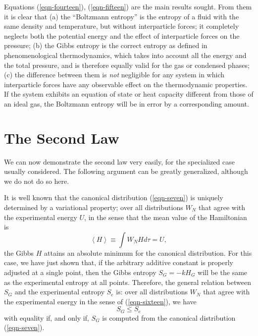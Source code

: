 \documentclass[twocolumn]{article}
\begin{document}
Equations (\ref{eqn-fourteen}), (\ref{eqn-fifteen}) are the main
results sought. From them it is clear that (a) the ``Boltzmann
entropy'' is the entropy of a fluid with the same density and
temperature, but without interparticle forces; it completely neglects
both the potential energy and the effect of interparticle forces on
the pressure; (b) the Gibbs entropy is the correct entropy as defined
in phenomenological thermodynamics, which takes into account all the
energy and the total pressure, and is therefore equally valid for the
gas or condensed phases; (c) the difference between them is \emph{not}
negligible for any system in which interparticle forces have any
observable effect on the thermodynamic properties. If the system
exhibits an equation of state or heat capacity different from those of
an ideal gas, the Boltzmann entropy will be in error by a
corresponding amount.

\section{The Second Law}\label{sec-the-second-law}

We can now demonstrate the second law very easily, for the specialized
case usually considered. The following argument can be greatly
generalized, although we do not do so here.

It is well known \citep{Jaynes-brandeis62} that the canonical distribution (\ref{eqn-seven})
is uniquely determined by a variational property; over all distributions
\(W_{N}\) that agree with the experimental energy \(U\), in the sense
that the mean value of the Hamiltonian is
%
\begin{equation}
\left\langle H \right\rangle \equiv \int W_{N}H{d\tau} = U,
\label{eqn-sixteen}
\end{equation}
%
the Gibbs \(H\) attains an absolute minimum for the canonical
distribution. For this case, we have just shown that, if the arbitrary
additive constant is properly adjusted at a single point, then the Gibbs
entropy \(S_{G} = - kH_{G}\) will be the same as the experimental
entropy at all points. Therefore, the general relation between \(S_{G}\)
and the experimental entropy \(S_{e}\) is: over all distributions
\(W_{N}\) that agree with the experimental energy in the sense of (\ref{eqn-sixteen}),
we have
%
\begin{equation}
S_{G} \leq S_{e}
\label{eqn-seventeen}
\end{equation}
%
with equality if, and only if, \(S_{G}\) is computed from the canonical
distribution (\ref{eqn-seven}).
\end{document}
